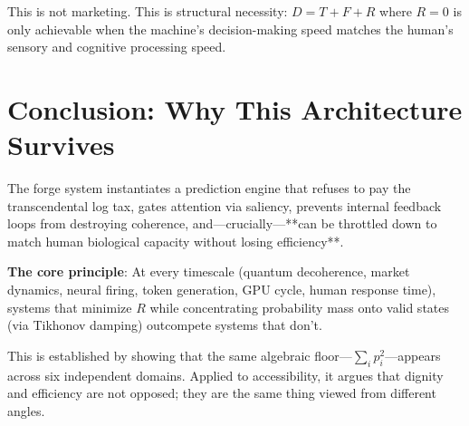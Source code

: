 \documentclass[11pt,oneside]{article}
\theoremstyle{definition}
\begin{document}
This is not marketing. This is structural necessity: $D = T + F + R$ where $R = 0$ is only achievable when the machine's decision-making speed matches the human's sensory and cognitive processing speed.

\section{Conclusion: Why This Architecture Survives}

The forge system instantiates a prediction engine that refuses to pay the transcendental log tax, gates attention via saliency, prevents internal feedback loops from destroying coherence, and—crucially—**can be throttled down to match human biological capacity without losing efficiency**.

\textbf{The core principle}: At every timescale (quantum decoherence, market dynamics, neural firing, token generation, GPU cycle, human response time), systems that minimize $R$ while concentrating probability mass onto valid states (via Tikhonov damping) outcompete systems that don't.

This is established by showing that the same algebraic floor—$\sum_i p_i^2$—appears across six independent domains. Applied to accessibility, it argues that dignity and efficiency are not opposed; they are the same thing viewed from different angles.
\end{document}
